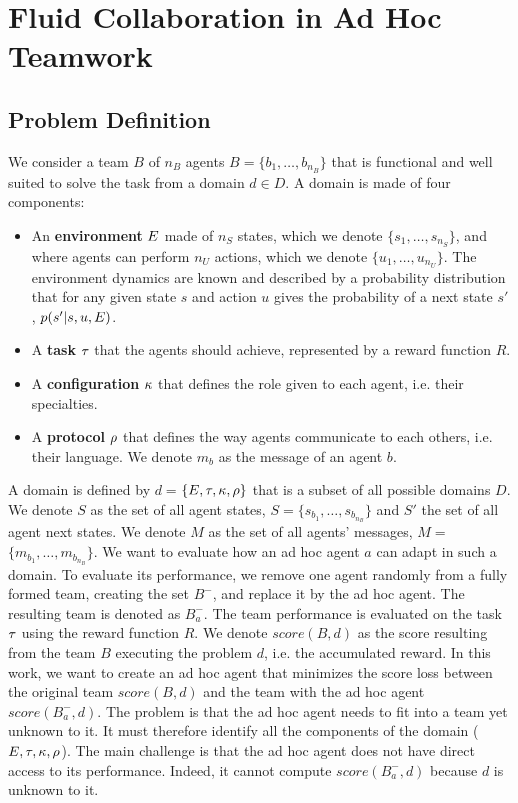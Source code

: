 \section{Fluid Collaboration in Ad Hoc Teamwork}
\label{sec:problem}

\subsection{Problem Definition}

We consider a team $B$ of $n_B$ agents $B = \{b_1, \ldots , b_{n_B}\}$ that is functional and well suited to solve the task from a domain $d \in D$. A domain is made of four components:

\begin{itemize}
\item An \textbf{environment} $E$ made of $n_S$ states, which we denote $\{s_1, \ldots, s_{n_S}\}$, and where agents can perform $n_U$ actions, which we denote $\{u_1, \ldots, u_{n_U}\}$. The environment dynamics are known and described by a probability distribution that for any given state $s$ and action $u$ gives the probability of a next state $s'$, $p(s'|s,u,E)$.
\item A \textbf{task} $\tau$ that the agents should achieve, represented by a reward function $R$.
\item A \textbf{configuration} $\kappa$ that defines the role given to each agent, i.e. their specialties.
\item A \textbf{protocol} $\rho$ that defines the way agents communicate to each others, i.e. their language. We denote $m_{b}$ as the message of an agent $b$.
\end{itemize}

A domain is defined by $d$$=$$\{E, \tau, \kappa, \rho\}$ that is a subset of all possible domains $D$. We denote $S$ as the set of all agent states, $ S$$=$$\{ s_{b_1}, \ldots, s_{b_{n_B}} \} $ and $S'$ the set of all agent next states. We denote $M$ as the set of all agents' messages, $M$$=$$\{m_{b_1}, \ldots, m_{b_{n_B}}\}$. We want to evaluate how an ad hoc agent $a$ can adapt in such a domain. To evaluate its performance, we remove one agent randomly from a fully formed team, creating the set $B^-$, and replace it by the ad hoc agent. The resulting team is denoted as $B^{-}_{a}$.
%
The team performance is evaluated on the task $\tau$ using the reward function $R$. We denote $score(B, d)$ as the score resulting from the team $B$ executing the problem $d$, i.e. the accumulated reward. In this work, we want to create an ad hoc agent that minimizes the score loss between the original team $score(B, d)$ and the team with the ad hoc agent $score(B^{-}_{a}, d)$. The problem is that the ad hoc agent needs to fit into a team yet unknown to it. It must therefore identify all the components of the domain ($E, \tau, \kappa, \rho$). The main challenge is that the ad hoc agent does not have direct access to its performance. Indeed, it cannot compute $score(B^{-}_{a}, d)$ because $d$ is unknown to it.


